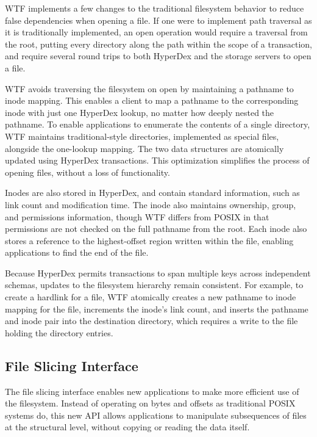 \documentclass[twocolumn,10pt,letterpaper]{article}
\begin{document}
WTF implements a few changes to the traditional filesystem behavior to reduce
false dependencies when opening a file.  If one were to implement path traversal
as it is traditionally implemented, an open operation would require a traversal
from the root, putting every directory along the path within the scope of a
transaction, and require several round trips to both HyperDex and the storage
servers to open a file.

WTF avoids traversing the filesystem on open by maintaining a pathname to inode
mapping.  This enables a client to map a pathname to the corresponding inode
with just one HyperDex lookup, no matter how deeply nested the pathname.  To
enable applications to enumerate the contents of a single directory, WTF
maintains traditional-style directories, implemented as special files, alongside
the one-lookup mapping.  The two data structures are atomically updated using
HyperDex transactions.  This optimization simplifies the process of opening
files, without a loss of functionality.

Inodes are also stored in HyperDex, and contain standard information, such as
link count and modification time.  The inode also maintains ownership, group,
and permissions information, though WTF differs from POSIX in that permissions
are not checked on the full pathname from the root.  Each inode also stores a
reference to the highest-offset region written within the file, enabling
applications to find the end of the file.

Because HyperDex permits transactions to span multiple keys across independent
schemas, updates to the filesystem hierarchy remain consistent.  For example, to
create a hardlink for a file, WTF atomically creates a new pathname to inode
mapping for the file, increments the inode's link count, and inserts the
pathname and inode pair into the destination directory, which requires a write
to the file holding the directory entries.

\subsection{File Slicing Interface}

The file slicing interface enables new applications to make more efficient use
of the filesystem.  Instead of operating on bytes and offsets as traditional
POSIX systems do, this new API allows applications to manipulate subsequences of
files at the structural level, without copying or reading the data itself.
\end{document}
